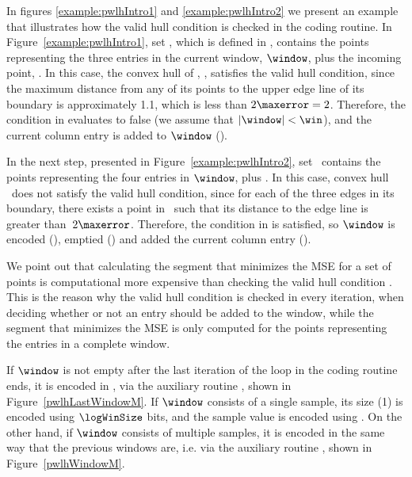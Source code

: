 In figures \ref{example:pwlhIntro1} and \ref{example:pwlhIntro2} we present an example that illustrates how the valid hull condition is checked in the coding routine. In Figure~\ref{example:pwlhIntro1}, set \PWLHSet, which is defined in , contains the points representing the three entries in the current window, $\window$, plus the incoming point, . In this case, the convex hull of \PWLHSet, \hull, satisfies the valid hull condition, since the maximum distance from any of its points to the upper edge line of its boundary is approximately 1.1, which is less than $2\maxerror = 2$. Therefore, the condition in  evaluates to false (we assume that $|\window|<\win$), and the current column entry is added to $\window$ ().


In the next step, presented in Figure~\ref{example:pwlhIntro2}, set \PWLHSet\ contains the points representing the four entries in $\window$, plus . In this case, convex hull \hull\ does not satisfy the valid hull condition, since for each of the three edges in its boundary, there exists a point in \hull\ such that its distance to the edge line is greater than~$2\maxerror$. Therefore, the condition in  is satisfied, so $\window$ is encoded (), emptied () and added the current column entry ().


\examplePWLH


We point out that calculating the segment that minimizes the MSE for a set of points is computational more expensive than checking the valid hull condition \cite{AnEva2013}. This is the reason why the valid hull condition is checked in every iteration, when deciding whether or not an entry should be added to the window, while the segment that minimizes the MSE is only computed for the points representing the entries in a complete window.


If $\window$ is not empty after the last iteration of the loop in the coding routine ends, it is encoded in , via the auxiliary routine \EncodeLastWindowCA, shown in Figure~\ref{pwlhLastWindowM}. If $\window$ consists of a single sample, its size (1) is encoded using $\logWinSize$ bits, and the sample value is encoded using \tobitexp. On the other hand, if $\window$ consists of multiple samples, it is encoded in the same way that the previous windows are, i.e. via the auxiliary routine \EncodeWindow, shown in Figure~\ref{pwlhWindowM}.





